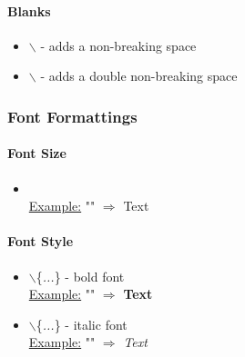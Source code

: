 \paragraph{Blanks}
  \begin{itemize}
    \item $\backslash$ - adds a non-breaking space\\
    \item $\backslash$ - adds a double non-breaking space
  \end{itemize}

\newpage
  
\subsubsection{Font Formattings}

\paragraph{Font Size}
  \begin{itemize}
    \item {}\\
          \underline{Example:} "" $\Rightarrow$ \large{Text} \normalsize{ }
  \end{itemize}

\paragraph{Font Style}
  \begin{itemize}
    \item $\backslash$\{\textit{...}\} - bold font\\
          \underline{Example:} "" $\Rightarrow$ \textbf{Text}
    \item $\backslash$\{\textit{...}\} - italic font\\
          \underline{Example:} "" $\Rightarrow$ \textit{Text}
  \end{itemize}

